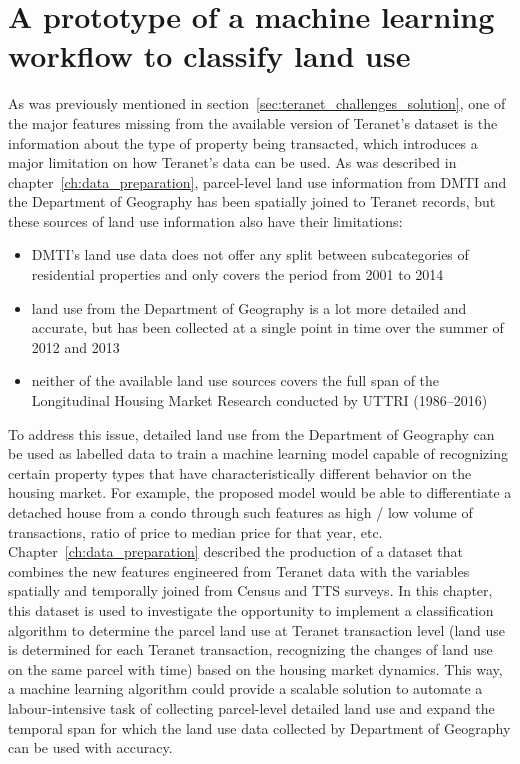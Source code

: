 \chapter{A prototype of a machine learning workflow to classify land use} \label{ch:ml_workflow}

As was previously mentioned in section~\ref{sec:teranet_challenges_solution}, one of the major features missing from the available version of Teranet's dataset is the information about the type of property being transacted, which introduces a major limitation on how Teranet's data can be used.
As was described in chapter~\ref{ch:data_preparation}, parcel-level land use information from DMTI and the Department of Geography has been spatially joined to Teranet records, but these sources of land use information also have their limitations:

\begin{itemize}
    \item DMTI's land use data does not offer any split between subcategories of residential properties and only covers the period from 2001 to 2014
    \item land use from the Department of Geography is a lot more detailed and accurate, but has been collected at a single point in time over the summer of 2012 and 2013
    \item neither of the available land use sources covers the full span of the Longitudinal Housing Market Research conducted by UTTRI (1986--2016)
\end{itemize}

To address this issue, detailed land use from the Department of Geography can be used as labelled data to train a machine learning model capable of recognizing certain property types that have characteristically different behavior on the housing market.
For example, the proposed model would be able to differentiate a detached house from a condo through such features as high / low volume of transactions, ratio of price to median price for that year, etc.
Chapter~\ref{ch:data_preparation} described the production of a dataset that combines the new features engineered from Teranet data with the variables spatially and temporally joined from Census and TTS surveys.
In this chapter, this dataset is used to investigate the opportunity to implement a classification algorithm to determine the parcel land use at Teranet transaction level (land use is determined for each Teranet transaction, recognizing the changes of land use on the same parcel with time) based on the housing market dynamics.
This way, a machine learning algorithm could provide a scalable solution to automate a labour-intensive task of collecting parcel-level detailed land use and expand the temporal span for which the land use data collected by Department of Geography can be used with accuracy.

